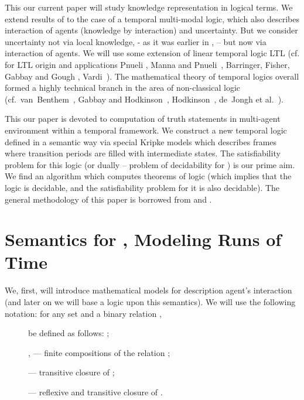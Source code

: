 \documentclass[runningheads]{llncs}
\begin{document}
This our current paper will study knowledge representation in logical terms.
We extend  results of \cite{vris}  to the case of a temporal multi-modal logic,
which also describes interaction of agents (knowledge by
interaction) and uncertainty. But we consider uncertainty  not via local knowledge, - as it was earlier in \cite{vris}, -- but now
via interaction of agents. We will use some extension of linear temporal  logic LTL
(cf. for LTL origin and applications
  Pnueli \cite{pnu},
 Manna and Pnueli~\cite{mp1},
  Barringer, Fisher, Gabbay and  Gough \cite{bf},
 Vardi~\cite{var3}).
  The mathematical theory
of temporal logics overall formed a highly technical branch in
the area of non-classical logic
 (cf.~van~Benthem~\cite{vb31,vb32},
  Gabbay and Hodkinson~\cite{gh1}, Hodkinson~\cite{hod1},
   de~Jongh et al.~\cite{ddj1}).

This our paper is devoted to computation of truth statements in multi-agent environment
within a temporal framework.
  We construct a new temporal logic  defined in a semantic
 way via special Kripke models
  which describes frames where transition periods are filled
  with intermediate states.
   The
  satisfiability problem for this logic (or dually -- problem of
  decidability for ) is our prime aim.
 We find  an algorithm which computes theorems of logic 
(which implies that the logic is decidable, and the satisfiability problem
for it is also decidable).
 The general methodology of this paper
is borrowed from \cite{rit07} and
\cite{vris,DBLP:journals/logcom/Rybakov09}.




\section{Semantics for , Modeling Runs of Time}

We, first, will introduce mathematical models for description agent's interaction
(and later on we will base a logic upon this semantics). We will use the following notation: 
 for
any set  and a binary relation ,

\begin{description}
    \item[]
 be defined as follows:
 ;
      \medskip
    \item []
  ,  --- finite compositions of the relation ;
      \medskip
    \item[]
   --- transitive closure of ;
      \medskip
    \item[]
   --- reflexive and transitive
  closure of .
    \end{description}
\end{document}
